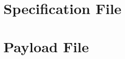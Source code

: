 \documentclass{article}
\begin{document}
    \section*{Specification File}
    


    \section*{Payload File}
    
\end{document}
